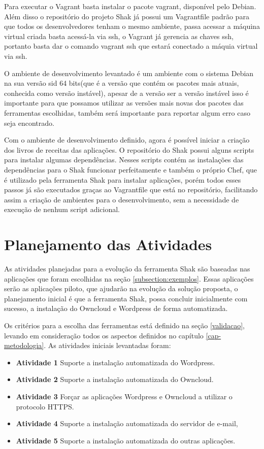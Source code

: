 Para executar o Vagrant basta instalar o pacote vagrant, disponível pelo Debian. Além disso
o repositório do projeto Shak já possui um Vagrantfile padrão para que todos os
desenvolvedores tenham o mesmo ambiente, passa acessar a máquina virtual criada
basta acessá-la via ssh, o Vagrant já gerencia as chaves ssh, portanto basta
dar o comando vagrant ssh que estará conectado a máquia virtual via ssh.

O ambiente de desenvolvimento levantado é um ambiente com o sistema Debian na sua versão
sid 64 bits(que é a versão que contém os pacotes mais atuais, conhecida como versão instável),
apesar de a versão ser a versão instável isso é importante para que possamos
utilizar as versões mais novas dos pacotes das ferramentas escolhidas, também
será importante para reportar algum erro caso seja encontrado.

Com o ambiente de desenvolvimento definido, agora é possível iniciar a criação dos
livros de receitas das aplicações. O repositório do Shak possui alguns scripts
para instalar algumas dependências. Nesses scripts contém as instalações das 
dependências para o Shak funcionar perfeitamente
e também o próprio Chef, que é utilizado pela ferramenta Shak para instalar aplicações, 
porém todos esses passos já são executados graças ao Vagrantfile
que está no repositório, facilitando assim a criação de ambientes para o desenvolvimento,
sem a necessidade de execução de nenhum script adicional.


\section{Planejamento das Atividades}

As atividades planejadas para a evolução da ferramenta Shak são baseadas nas 
aplicações que foram escolhidas na seção
\ref{subsection:exemplos}. Essas aplicações serão as aplicações piloto, que 
ajudarão na evolução da solução proposta, o planejamento inicial é que a ferramenta 
Shak, possa concluir inicialmente com sucesso, a instalação do Owncloud e Wordpress de forma 
automatizada. 

Os critérios para a escolha das ferramentas está definido na seção \ref{validacao},
levando em consideração todos os aspectos definidos no capítulo
\ref{cap-metodologia}. As atividades iniciais levantadas foram:

 \begin{itemize}
   \item \textbf{Atividade 1} Suporte a instalação automatizada do Wordpress.
   \item \textbf{Atividade 2} Suporte a instalação automatizada do Owncloud.
   \item \textbf{Atividade 3} Forçar as aplicações Wordpress e Owncloud a
   utilizar o protocolo HTTPS.
   \item \textbf{Atividade 4} Suporte a instalação automatizada do servidor de e-mail,
   \item \textbf{Atividade 5} Suporte a instalação automatizada do outras aplicações.
 \end{itemize}

